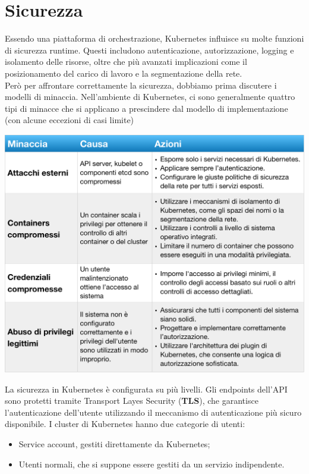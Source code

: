 \documentclass[12pt, a4paper]{report}
\begin{document}
\section{Sicurezza}
Essendo una piattaforma di orchestrazione, Kubernetes influisce su molte funzioni di sicurezza runtime. Questi includono autenticazione, autorizzazione, logging e isolamento delle risorse, oltre che più avanzati implicazioni come il posizionamento del carico di lavoro e la segmentazione della rete. \\
Però per affrontare correttamente la sicurezza, dobbiamo prima discutere i modelli di minaccia. Nell'ambiente di Kubernetes, ci sono generalmente quattro tipi di minacce che si applicano a prescindere dal modello di implementazione (con alcune eccezioni di casi limite)\\
\begin{center}
  \includegraphics[width=\linewidth]{Images/Kubernetes-minacce}
\end{center}
La sicurezza in Kubernetes è configurata su più livelli. Gli endpoints dell'API sono protetti tramite Transport Layes Security (\textbf{TLS}), che garantisce l'autenticazione dell'utente utilizzando il meccanismo di autenticazione più sicuro disponibile. I cluster di Kubernetes hanno due categorie di utenti:
\begin{itemize}
  \item Service account, gestiti direttamente da Kubernetes;
  \item Utenti normali, che si suppone essere gestiti da un servizio indipendente.
\end{itemize}
\end{document}
